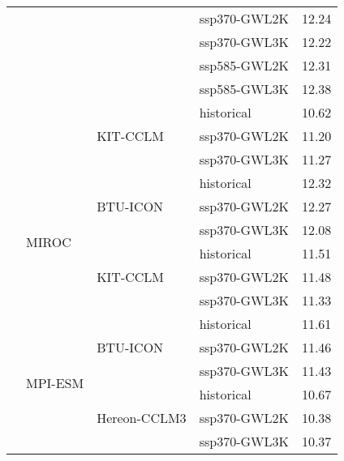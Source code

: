 \begin{table}[!htbp]
\begin{tabular}{lll|l|c}
 &  &  & ssp370-GWL2K & 12.24 \\
 &  &  & ssp370-GWL3K & 12.22 \\
 &  &  & ssp585-GWL2K & 12.31 \\
 &  &  & ssp585-GWL3K & 12.38 \\
\cmidrule(lr){3-4}
 &  & \multirow{3}{*}{KIT-CCLM} & historical & 10.62 \\
 &  &  & ssp370-GWL2K & 11.20 \\
 &  &  & ssp370-GWL3K & 11.27 \\
\cmidrule(lr){3-4}
\cmidrule(lr){2-4}
 & \multirow{6}{*}{MIROC} & \multirow{3}{*}{BTU-ICON} & historical & 12.32 \\
 &  &  & ssp370-GWL2K & 12.27 \\
 &  &  & ssp370-GWL3K & 12.08 \\
\cmidrule(lr){3-4}
 &  & \multirow{3}{*}{KIT-CCLM} & historical & 11.51 \\
 &  &  & ssp370-GWL2K & 11.48 \\
 &  &  & ssp370-GWL3K & 11.33 \\
\cmidrule(lr){3-4}
\cmidrule(lr){2-4}
 & \multirow{6}{*}{MPI-ESM} & \multirow{3}{*}{BTU-ICON} & historical & 11.61 \\
 &  &  & ssp370-GWL2K & 11.46 \\
 &  &  & ssp370-GWL3K & 11.43 \\
\cmidrule(lr){3-4}
 &  & \multirow{3}{*}{Hereon-CCLM3} & historical & 10.67 \\
 &  &  & ssp370-GWL2K & 10.38 \\
 &  &  & ssp370-GWL3K & 10.37 \\
\bottomrule
\end{tabular}
\end{table}
